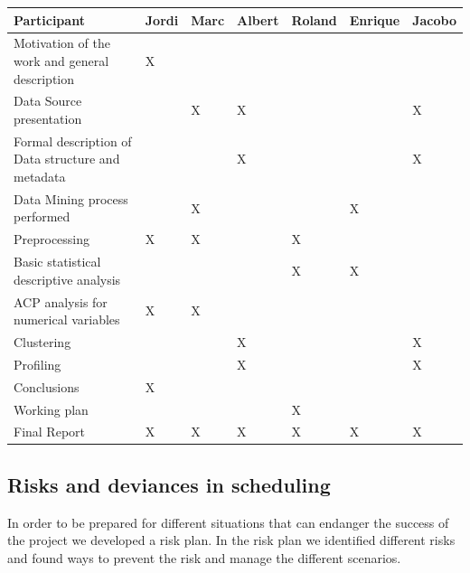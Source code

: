 \begin{table}[H]
\begin{tabular}{|l|l|l|l|l|l|l|}
\hline
Participant                                       & Jordi & Marc & Albert & Roland & Enrique & Jacobo \\ \hline
Motivation of the work and general description    &   X   &          &      &      &         &        \\ \hline
Data Source presentation                          &      &     X     &   X    &      &       &    X    \\ \hline
Formal description of Data structure and metadata &      &          &   X    &      &        &    X    \\ \hline
Data Mining process performed                     &      &     X     &       &     &     X     &        \\ \hline
Preprocessing                                     &   X   &     X     &      &   X   &          &        \\ \hline
Basic statistical descriptive analysis            &      &          &       &  X    & X        &        \\ \hline
ACP analysis for numerical variables              & X    &  X        &       &      &          &        \\ \hline
Clustering                                        &      &          &   X    &     &          &    X    \\ \hline
Profiling                                         &      &          &   X    &      &          & X      \\ \hline
Conclusions                                       & X    &         &      &     &          &      \\ \hline
Working plan                                      &      &          &     &   X   &          &        \\ \hline
Final Report                                      &  X   &  X       &   X   &   X   &  X       &   X     \\ \hline
\end{tabular}
\end{table}

\subsection{Risks and deviances in scheduling}

In order to be prepared for different situations that can endanger the success of the project we developed a risk plan. In the risk plan we identified different risks and found ways to prevent the risk and manage the different scenarios.%


